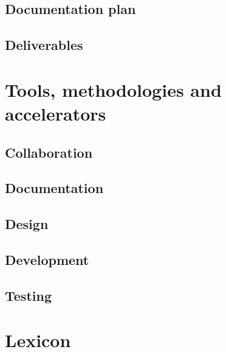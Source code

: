 \documentclass[a4paper,12pt,abstracton,titlepage]{scrartcl}
\begin{document}
\subsection{Documentation plan}
\subsection{Deliverables}

\section{Tools, methodologies and accelerators}
\subsection{Collaboration}
\subsection{Documentation}
\subsection{Design}
\subsection{Development}
\subsection{Testing}

\newpage
\appendix
\section{Lexicon}
\end{document}
